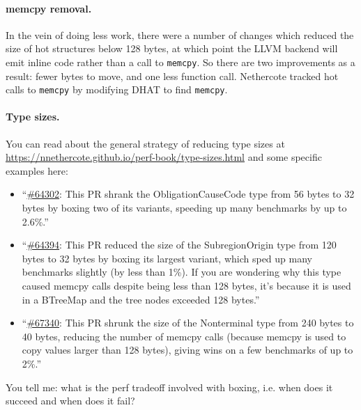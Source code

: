\documentclass[a4paper]{report}
\begin{document}
\paragraph{memcpy removal.} In the vein of doing less work, there were a number of changes
which reduced the size of hot structures below 128 bytes, at which point the LLVM backend will
emit inline code rather than a call to \texttt{memcpy}. So there are two improvements as a result:
fewer bytes to move, and one less function call.
Nethercote tracked hot calls to \texttt{memcpy}
by modifying DHAT to find \texttt{memcpy}.

\paragraph{Type sizes.} You can read about the general strategy of reducing type sizes at \url{https://nnethercote.github.io/perf-book/type-sizes.html} and some specific examples here:
\begin{itemize}[noitemsep]
\item ``\href{https://github.com/rust-lang/rust/pull/64302}{\#64302}: This PR shrank the ObligationCauseCode type from 56 bytes to 32 bytes by boxing two of its variants, speeding up many benchmarks by up to 2.6\%.''
\item ``\href{https://github.com/rust-lang/rust/pull/64394}{\#64394}: This PR reduced the size of the SubregionOrigin type from 120 bytes to 32 bytes by boxing its largest variant, which sped up many benchmarks slightly (by less than 1\%). If you are wondering why this type caused memcpy calls despite being less than 128 bytes, it's because it is used in a BTreeMap and the tree nodes exceeded 128 bytes.''
\item ``\href{https://github.com/rust-lang/rust/pull/67340}{\#67340}: This PR shrunk the size of the Nonterminal type from 240 bytes to 40 bytes, reducing the number of memcpy calls (because memcpy is used to copy values larger than 128 bytes), giving wins on a few benchmarks of up to 2\%.''
\end{itemize}
You tell me: what is the perf tradeoff involved with boxing, i.e. when does it succeed and when does it fail?
\end{document}
